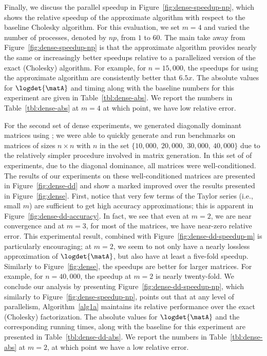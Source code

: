Finally, we discuss the parallel speedup in Figure~\ref{fig:dense-speedup-np},
which shows the relative speedup of the approximate algorithm with respect to
the baseline Cholesky algorithm.
For this evaluation, we set $m=4$ and varied the number of processes, denoted by $np$,
from $1$ to $60$.
The main take away from Figure~\ref{fig:dense-speedup-np} is that the
approximate algorithm provides nearly the same or increasingly better speedups
relative to a parallelized version of the exact (Cholesky) algorithm.
For example, for $n=15,000$, the speedups for using the approximate algorithm
are consistently better that $6.5x$.
The absolute values for $\logdet{\matA}$ and timing along with the baseline
numbers for this experiment are given in Table~\ref{tbl:dense-abs}.
We report the numbers in Table~\ref{tbl:dense-abs} at $m=4$ at which point, we
have low relative error.

For the second set of dense experiments, we generated diagonally dominant
matrices using ; we were able to quickly generate and
run benchmarks on matrices of sizes $n \times n$ with $n$ in the set $\{10,000,\ 20,000,\ 30,000,\ 40,000\}$ due to the
relatively simpler procedure involved in matrix generation.
In this set of of experiments, due to the diagonal dominance, all matrices
were well-conditioned.
The results of our experiments on these well-conditioned matrices are
presented in Figure~\ref{fig:dense-dd} and show a marked improved over the
results presented in Figure~\ref{fig:dense}.
First, notice that very few terms of the Taylor series (i.e., small $m$) are
sufficient to get high accuracy approximations; this is apparent in Figure~\ref{fig:dense-dd-accuracy}.
In fact, we see that even at $m=2$, we are near convergence and at $m=3$, for
most of the matrices, we have near-zero relative error.
This experimental result, combined with Figure~\ref{fig:dense-dd-speedup-m} is particularly encouraging; at $m=2$, we seem to not only have a nearly lossless approximation of $\logdet{\matA}$, but also have at least a five-fold speedup.
Similarly to Figure~\ref{fig:dense}, the speedups are better for larger matrices.
For example, for $n=40,000$, the speedup at $m=2$ is nearly twenty-fold.
We conclude our analysis by presenting Figure~\ref{fig:dense-dd-speedup-np},
which similarly to Figure~\ref{fig:dense-speedup-np}, points out that at any
level of parallelism, Algorithm~\ref{alg1a} maintains its relative performance
over the exact (Cholesky) factorization.
The absolute values for $\logdet{\matA}$ and the corresponding running times, along with the baseline
for this experiment are presented in Table~\ref{tbl:dense-dd-abs}.
We report the numbers in Table~\ref{tbl:dense-abs} at $m=2$, at which point we
have a low relative error.


